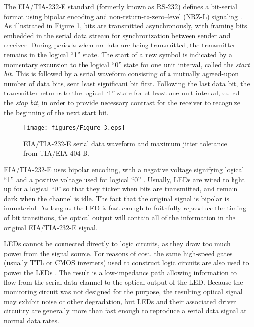 \documentclass{acmtrans2e}
\begin{document}
The EIA/TIA-232-E standard (formerly known as RS-232) defines a
bit-serial format using bipolar encoding and non-return-to-zero--level 
(NRZ-L) signaling \cite{eia_tia_232_e}.  As illustrated in Figure
\ref{jitter_tolerance_figure}, bits are
transmitted asynchronously, with framing 
bits embedded in the serial data stream for synchronization 
between sender and receiver.  During periods when no data are being 
transmitted, the transmitter remains in the logical ``1'' state.  The 
start of a new symbol is indicated by a momentary excursion to the 
logical ``0'' state for one unit interval, called the {\it start bit}.  
This is followed by a serial waveform consisting of a mutually
agreed-upon number of data bits, sent least significant bit first.  Following 
the last data bit, the transmitter returns to the logical ``1'' state 
for at least one unit interval, called the {\it stop bit}, in order to 
provide necessary contrast for the receiver to recognize the 
beginning of the next start bit.

\begin{figure}
\centering
\texttt{[image: figures/Figure\_3.eps]}
\caption{EIA/TIA-232-E serial data waveform and maximum jitter
tolerance from TIA/EIA-404-B.}
\label{jitter_tolerance_figure}
\end{figure}

EIA/TIA-232-E uses bipolar encoding, with a negative voltage signifying 
logical ``1'' and a positive voltage used for logical ``0''
\cite{black}.  Usually, 
LEDs are wired to light up for a logical ``0'' so that they flicker when 
bits are transmitted, and remain dark when the channel is idle.  The 
fact that the original signal is bipolar is immaterial.  As long as 
the LED is fast enough to faithfully reproduce the timing of bit transitions, 
the optical output will contain all of the information in the 
original EIA/TIA-232-E signal.

LEDs cannot be connected directly to logic circuits, as they draw too 
much power from the signal source.  For reasons of cost, the same high-speed
gates (usually TTL or CMOS inverters) used to construct logic circuits
are also used to power the LEDs \cite{ttl_cookbook}.
The result is a low-impedance path allowing information to flow from the serial
data channel to the optical output of the LED.  Because the monitoring circuit
was not designed for the
purpose, the resulting optical signal may exhibit noise or other degradation,
but LEDs and their associated driver circuitry are generally more than fast
enough to reproduce a serial data signal at normal data rates.
\end{document}
